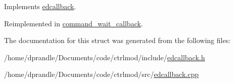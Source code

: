 Implements \hyperlink{structedcallback_ab8003af2178e58a94f53370b1f48a313}{edcallback}.



Reimplemented in \hyperlink{structcommand__wait__callback_ae5ab034230cd73f6203cee386ba1993c}{command\-\_\-wait\-\_\-callback}.



The documentation for this struct was generated from the following files\-:\begin{DoxyCompactItemize}
\item 
/home/dprandle/\-Documents/code/ctrlmod/include/\hyperlink{edcallback_8h}{edcallback.\-h}\item 
/home/dprandle/\-Documents/code/ctrlmod/src/\hyperlink{edcallback_8cpp}{edcallback.\-cpp}\end{DoxyCompactItemize}
